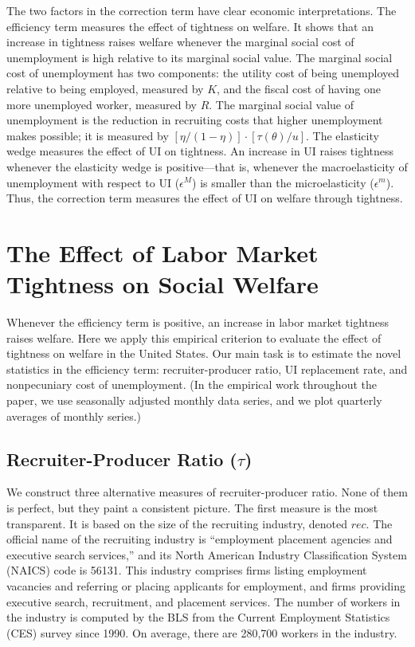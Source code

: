 \documentclass[letterpaper,12pt,leqno]{article}
\newcommand{\brk}[1]{\left[ #1 \right]}
\def \e{{\epsilon}}
\def \t{{\theta}}
\begin{document}
The two factors in the correction term have clear economic interpretations. The efficiency term measures the effect of tightness on welfare. It shows that an increase in tightness raises welfare whenever the marginal social cost of unemployment is high relative to its marginal social value. The marginal social cost of unemployment has two components: the utility cost of being unemployed relative to being employed, measured by $K$, and the fiscal cost of having one more unemployed worker, measured by $R$. The marginal social value of unemployment is the reduction in recruiting costs that higher unemployment makes possible; it is measured by $\brk{\eta/(1-\eta)} \cdot \brk{\tau(\t)/u}$. The elasticity wedge measures the effect of UI on tightness. An increase in UI raises tightness whenever the elasticity wedge is positive---that is, whenever the macroelasticity of unemployment with respect to UI ($\e^M$) is smaller than the microelasticity ($\e^m$). Thus, the correction term measures the effect of UI on welfare through tightness. 

\section{The Effect of Labor Market Tightness on Social Welfare}\label{sec:efficiency}

Whenever the efficiency term is positive, an increase in labor market tightness raises welfare. Here we apply this empirical criterion to evaluate the effect of tightness on welfare in the United States. Our main task is to estimate the novel statistics in the efficiency term: recruiter-producer ratio, UI replacement rate, and nonpecuniary cost of unemployment. (In the empirical work throughout the paper, we use seasonally adjusted monthly data series, and we plot quarterly averages of monthly series.)

\subsection{Recruiter-Producer Ratio ($\tau$)}
 
We construct three alternative measures of recruiter-producer ratio. None of them is perfect, but they paint a consistent picture.  The first measure is the most transparent. It is based on the size of the recruiting industry, denoted $rec$. The official name of the recruiting industry is ``employment placement agencies and executive search services,'' and its North American Industry Classification System (NAICS) code is 56131. This industry comprises firms listing employment vacancies and referring or placing applicants for employment, and firms providing executive search, recruitment, and placement services.  The number of workers in the industry is computed by the BLS from the Current Employment Statistics (CES) survey since 1990. On average, there are 280,700 workers in the industry.
\end{document}
